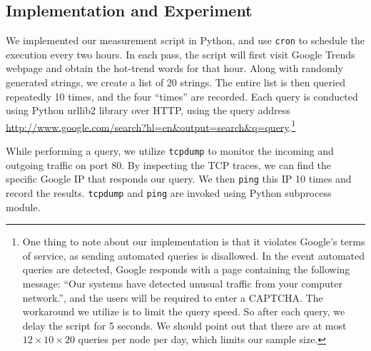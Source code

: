 

\subsection{Implementation and Experiment}
\label{sec:impl-exper}

We implemented our measurement script in Python, and use \texttt{cron} to schedule the execution every two hours. In each pass, the script will first visit Google Trends webpage and obtain the hot-trend words for that hour. Along with randomly generated strings, we create a list of 20 strings. The entire list is then queried repeatedly 10 times, and the four ``times'' are recorded. Each query is conducted using Python urllib2 library over HTTP, using the query address \url{http://www.google.com/search?hl=en\&output=search\&q=query}.\footnote{One thing to note about our implementation is that it violates Google's terms of service, as sending automated queries is disallowed. In the event automated queries are detected, Google responds with a page containing the following message: ``Our systems have detected unusual traffic from your computer network.'', and the users will be required to enter a CAPTCHA. The workaround we utilize is to limit the query speed. So after each query, we delay the script for 5 seconds. We should point out that there are at most $12\times10\times20$ queries per node per day, which limits our sample size.}

While performing a query, we utilize \texttt{tcpdump} to monitor the incoming and outgoing traffic on port 80. By inspecting the TCP traces, we can find the specific Google IP that responds our query. We then \texttt{ping} this IP 10 times and record the results. \texttt{tcpdump} and \texttt{ping} are invoked using Python subprocess module.

